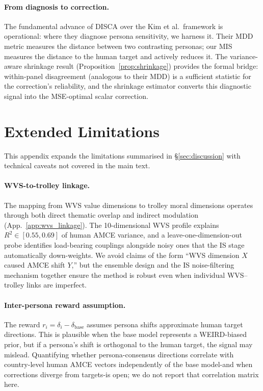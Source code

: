 \documentclass{article}
\begin{document}
\paragraph{From diagnosis to correction.} The fundamental advance of DISCA over the Kim et al.\ framework is operational: where they diagnose persona sensitivity, we harness it. Their MDD metric measures the distance between two contrasting personas; our MIS measures the distance to the human target and actively reduces it. The variance-aware shrinkage result (Proposition~\ref{prop:shrinkage}) provides the formal bridge: within-panel disagreement (analogous to their MDD) is a sufficient statistic for the correction's reliability, and the shrinkage estimator converts this diagnostic signal into the MSE-optimal scalar correction.

\section{Extended Limitations}
\label{app:limitations}

This appendix expands the limitations summarised in §\ref{sec:discussion} with technical caveats not covered in the main text.

\paragraph{WVS-to-trolley linkage.}
The mapping from WVS value dimensions to trolley moral dimensions operates through both direct thematic overlap and indirect modulation (App.~\ref{app:wvs_linkage}). The 10-dimensional WVS profile explains $R^2 \in [0.55, 0.69]$ of human AMCE variance, and a leave-one-dimension-out probe identifies load-bearing couplings alongside noisy ones that the IS stage automatically down-weights. We avoid claims of the form ``WVS dimension $X$ caused AMCE shift $Y$,'' but the ensemble design and the IS noise-filtering mechanism together ensure the method is robust even when individual WVS--trolley links are imperfect.

\paragraph{Inter-persona reward assumption.}
The reward $r_i = \delta_i - \delta_{\text{base}}$ assumes persona shifts approximate human target directions. This is plausible when the base model represents a WEIRD-biased prior, but if a persona's shift is orthogonal to the human target, the signal may mislead. Quantifying whether persona-consensus directions correlate with country-level human AMCE vectors independently of the base model-and when corrections diverge from targets-is open; we do not report that correlation matrix here.
\end{document}
